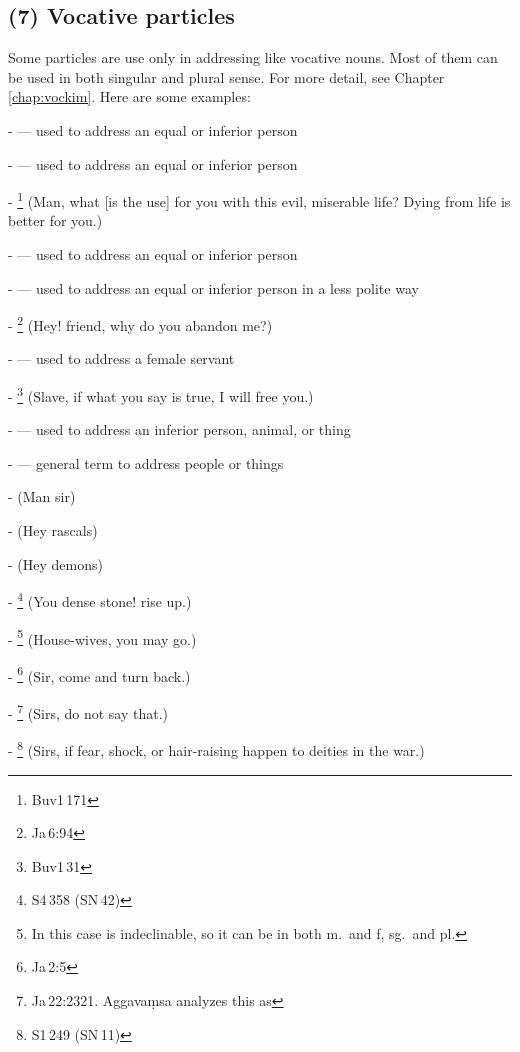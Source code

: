 \subsection*{(7) Vocative particles}\label{nip:voc}

Some particles are use only in addressing like vocative nouns. Most of them can be used in both singular and plural sense. For more detail, see Chapter \ref{chap:vockim}. Here are some examples:\par
-  --- used to address an equal or inferior person \par
-  --- used to address an equal or inferior person \par
- \footnote{Buv1\,171} (Man, what [is the use] for you with this evil, miserable life? Dying from life is better for you.) \par
-  --- used to address an equal or inferior person \par
-  --- used to address an equal or inferior person in a less polite way \par
- \footnote{Ja\,6:94} (Hey! friend, why do you abandon me?) \par
-  --- used to address a female servant \par
- \footnote{Buv1\,31} (Slave, if what you say is true, I will free you.) \par
-  --- used to address an inferior person, animal, or thing \par
-  --- general term to address people or things \par
-  (Man sir) \par
-  (Hey rascals) \par
-  (Hey demons) \par
- \footnote{S4\,358 (SN\,42)} (You dense stone! rise up.) \par
- \footnote{In this case  is indeclinable, so it can be in both m.\ and f, sg.\ and pl.} (House-wives, you may go.) \par
- \footnote{Ja\,2:5} (Sir, come and turn back.) \par
- \footnote{Ja\,22:2321. Aggava\d msa analyzes this as } (Sirs, do not say that.) \par
- \footnote{S1\,249 (SN\,11)} (Sirs, if fear, shock, or hair-raising happen to deities in the war.) \par

